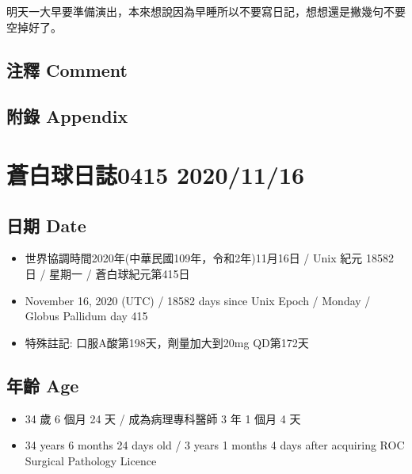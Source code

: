 \documentclass[
]{article}
\providecommand{\tightlist}{%
  \setlength{\itemsep}{0pt}\setlength{\parskip}{0pt}}
\begin{document}
明天一大早要準備演出，本來想說因為早睡所以不要寫日記，想想還是撇幾句不要空掉好了。

\hypertarget{ux6ce8ux91cb-comment-69}{%
\subsection{注釋 Comment}\label{ux6ce8ux91cb-comment-69}}

\hypertarget{ux9644ux9304-appendix-69}{%
\subsection{附錄 Appendix}\label{ux9644ux9304-appendix-69}}

\hypertarget{ux84bcux767dux7403ux65e5ux8a8c0415-20201116}{%
\section{蒼白球日誌0415
2020/11/16}\label{ux84bcux767dux7403ux65e5ux8a8c0415-20201116}}

\hypertarget{ux65e5ux671f-date-70}{%
\subsection{日期 Date}\label{ux65e5ux671f-date-70}}

\begin{itemize}
\tightlist
\item
  世界協調時間2020年(中華民國109年，令和2年)11月16日 / Unix 紀元 18582
  日 / 星期一 / 蒼白球紀元第415日
\item
  November 16, 2020 (UTC) / 18582 days since Unix Epoch / Monday /
  Globus Pallidum day 415
\item
  特殊註記: 口服A酸第198天，劑量加大到20mg QD第172天
\end{itemize}

\hypertarget{ux5e74ux9f61-age-70}{%
\subsection{年齡 Age}\label{ux5e74ux9f61-age-70}}

\begin{itemize}
\tightlist
\item
  34 歲 6 個月 24 天 / 成為病理專科醫師 3 年 1 個月 4 天
\item
  34 years 6 months 24 days old / 3 years 1 months 4 days after
  acquiring ROC Surgical Pathology Licence
\end{itemize}
\end{document}
